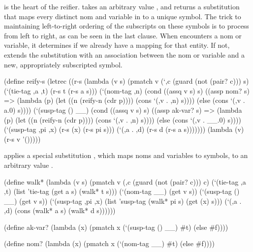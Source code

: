  is the heart of the reifier.   takes
an arbitrary value , and returns a substitution that maps
every distinct nom and variable in  to a unique symbol.  The
trick to maintaining left-to-right ordering of the subscripts on these
symbols is to process  from left to right, as can be seen in
the last  clause.  When  encounters a
nom or variable, it determines if we already have a mapping for that
entity.  If not,  extends the substitution with an
association between the nom or variable and a new, appropriately
subscripted symbol.

\schemedisplayspace
\begin{schemedisplay}
(define reify-s
  (letrec
    ((r-s (lambda (v s)
            (pmatch v
              (`,c (guard (not (pair? c))) s)
              (`(tie-tag ,a ,t) (r-s t (r-s a s)))
              (`(nom-tag ,n)
               (cond
                 ((assq v s) s)
                 ((assp nom? s)
                  => (lambda (p)
                       (let ((n (reify-n (cdr p))))
                         (cons `(,v . ,n) s))))
                 (else (cons `(,v . a.0) s))))
              (`(susp-tag () __)
               (cond
                 ((assq v s) s)
                 ((assp ak-var? s)
                  => (lambda (p)
                       (let ((n (reify-n (cdr p))))
                         (cons `(,v . ,n) s))))
                 (else (cons `(,v . __.0) s))))
              (`(susp-tag ,pi ,x)
               (r-s (x) (r-s pi s)))
              (`(,a . ,d) (r-s d (r-s a s)))))))
      (lambda (v)
        (r-s v '()))))
\end{schemedisplay}

 applies a special substitution , which
maps noms and variables to symbols, to an arbitrary value .

\schemedisplayspace
\begin{schemedisplay}
(define walk*
  (lambda (v s)
    (pmatch v
      (,c (guard (not (pair? c))) c)
      (`(tie-tag ,a ,t) (list 'tie-tag (get a s) (walk* t s)))
      (`(nom-tag __) (get v s))
      (`(susp-tag () __) (get v s))
      (`(susp-tag ,pi ,x) (list 'susp-tag (walk* pi s) (get (x) s)))
      (`(,a . ,d) (cons (walk* a s) (walk* d s))))))
\end{schemedisplay}

\begin{schemedisplay}
(define ak-var?
  (lambda (x)
    (pmatch x
      (`(susp-tag () __) #t)
      (else #f))))

(define nom?
  (lambda (x)
    (pmatch x
      (`(nom-tag __) #t)
      (else #f))))
\end{schemedisplay}

